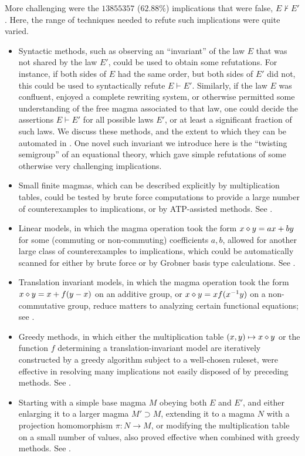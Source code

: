 More challenging were the $13855357$ ($62.88\%$) implications that were false, $E \not \vdash E'$. Here, the range of techniques needed to refute such implications were quite varied.
\begin{itemize}
        \item Syntactic methods, such as observing an ``invariant'' of the law $E$ that was not shared by the law $E'$, could be used to obtain some refutations.  For instance, if both sides of $E$ had the same order, but both sides of $E'$ did not, this could be used to syntactically refute $E \vdash E'$.  Similarly, if the law $E$ was confluent, enjoyed a complete rewriting system, or otherwise permitted some understanding of the free magma associated to that law, one could decide the assertions $E \vdash E'$ for all possible laws $E'$, or at least a significant fraction of such laws.  We discuss these methods, and the extent to which they can be automated in .  One novel such invariant we introduce here is the ``twisting semigroup'' of an equational theory, which gave simple refutations of some otherwise very challenging implications.
        \item Small finite magmas, which can be described explicitly by multiplication tables, could be tested by brute force computations to provide a large number of counterexamples to implications, or by ATP-assisted methods. See .
        \item Linear models, in which the magma operation took the form $x \diamond y = ax + by$ for some (commuting or non-commuting) coefficients $a,b$, allowed for another large class of counterexamples to implications, which could be automatically scanned for either by brute force or by Grobner basis type calculations. See .
        \item Translation invariant models, in which the magma operation took the form $x \diamond y = x + f(y-x)$ on an additive group, or $x \diamond y = x f(x^{-1} y)$ on a non-commutative group, reduce matters to analyzing certain functional equations; see .
        \item Greedy methods, in which either the multiplication table $(x,y) \mapsto x \diamond y$ or the function $f$ determining a translation-invariant model are iteratively constructed by a greedy algorithm subject to a well-chosen ruleset, were effective in resolving many implications not easily disposed of by preceding methods. See .
        \item Starting with a simple base magma $M$ obeying both $E$ and $E'$, and either enlarging it to a larger magma $M' \supset M$, extending it to a magma $N$ with a projection homomorphism $\pi: N \to M$, or modifying the multiplication table on a small number of values, also proved effective when combined with greedy methods. See .

\end{itemize}
